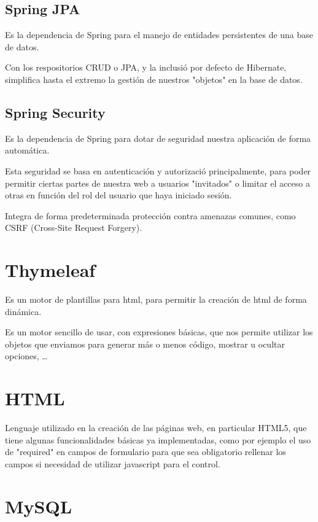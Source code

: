 \subsection{Spring JPA}

Es la dependencia de Spring para el manejo de entidades persistentes de una base de datos. 

Con los respositorios CRUD o JPA, y la inclusió por defecto de Hibernate, simplifica hasta el extremo la gestión de nuestros "objetos" en la base de datos.

\subsection{Spring Security}

Es la dependencia de Spring para dotar de seguridad nuestra aplicación de forma automática.

Esta seguridad se basa en autenticación y autorizació principalmente, para poder permitir ciertas partes de nuestra web a usuarios "invitados" o limitar el acceso a otras en función del rol del usuario que haya iniciado sesión.

Integra de forma predeterminada protección contra amenazas comunes, como CSRF (Cross-Site Request Forgery).

\section{Thymeleaf}

Es un motor de plantillas para html, para permitir la creación de html de forma dinámica.

Es un motor sencillo de usar, con expresiones básicas, que nos permite utilizar los objetos que enviamos para generar más o menos código, mostrar u ocultar opciones, \dots

\section{HTML}

Lenguaje utilizado en la creación de las páginas web, en particular HTML5, que tiene algunas funcionalidades básicas ya implementadas, como por ejemplo el uso de "required" en campos de formulario para que sea obligatorio rellenar los campos si necesidad de utilizar javascript para el control.

\section{MySQL}

